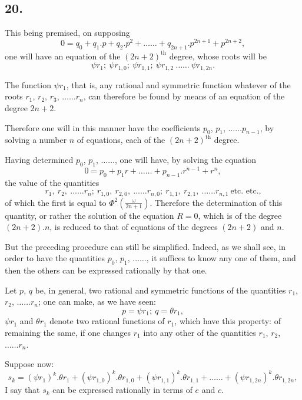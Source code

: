 \documentclass{article}
\begin{document}
\subsection*{20.}

This being premised, on supposing
\[ 0=q_{0}+q_{1}.p+q_{2}.p^{2}+\ldots\ldots+q_{2n+1}.p^{2n+1}+p^{2n+2}, \tag{104.} \]
one will have an equation of the $(2n+2)^{\text{th}}$ degree, whose roots will be
\[ \psi r_{1};\ \psi r_{1,0};\ \psi r_{1,1};\ \psi r_{1,2}\ \ldots\ldots\ \psi r_{1,2n}. \]


The function $\psi r_{1}$, that is, any rational and symmetric function whatever of the roots $r_{1}$, $r_{2}$, $r_{3}$, $\ldots\ldots r_{n}$, can therefore be found by means of an equation of the degree $2n+2$.

Therefore one will in this manner have the coefficients $p_{0}$, $p_{1}$, $\ldots\ldots p_{n-1}$, by solving a number $n$ of equations, each of the $(2n+2)^{\text{th}}$ degree.

Having determined $p_{0}$, $p_{1}$, $\ldots\ldots$, one will have, by solving the equation
\[ 0=p_{0}+p_{1}r+\ldots\ldots+p_{n-1}.r^{n-1}+r^{n}, \tag{105.} \]
the value of the quantities
\[ r_{1},\ r_{2},\ \ldots\ldots r_{n};\ r_{1,0},\ r_{2,0},\ \ldots\ldots r_{n,0};\ r_{1,1},\ r_{2,1},\ \ldots\ldots r_{n,1}\ \text{etc. etc.,} \]
of which the first is equal to $\Phi^{2}\left(\frac{\omega}{2n+1}\right)$. Therefore the determination of this quantity, or rather the solution of the equation $R=0$, which is of the degree $(2n+2).n$, is reduced to that of equations of the degrees $(2n+2)$ and $n$.

But the preceding procedure can still be simplified. Indeed, as we shall see, in order to have the quantities $p_{0}$, $p_{1}$, $\ldots\ldots$, it suffices to know any one of them, and then the others can be expressed rationally by that one.

Let $p$, $q$ be, in general, two rational and symmetric functions of the quantities $r_{1}$, $r_{2}$, $\ldots\ldots r_{n}$; one can make, as we have seen:
\[ p=\psi r_{1};\ q=\theta r_{1}, \]
$\psi r_{1}$ and $\theta r_{1}$ denote two rational functions of $r_{1}$, which have this property: of remaining the same, if one changes $r_{1}$ into any other of the quantities $r_{1}$, $r_{2}$, $\ldots\ldots r_{n}$.

Suppose now:
\[ s_{k}=(\psi r_{1})^{k}.\theta r_{1}+(\psi r_{1,0})^{k}.\theta r_{1,0}+(\psi r_{1,1})^{k}.\theta r_{1,1}+\ldots\ldots+(\psi r_{1,2n})^{k}.\theta r_{1,2n}, \]
I say that $s_{k}$ can be expressed rationally in terms of $e$ and $c$.
\end{document}
